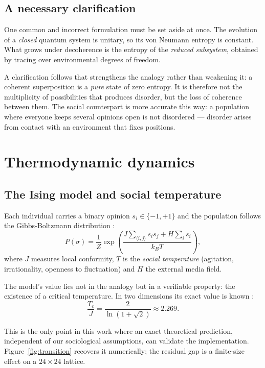 \documentclass[11pt,a4paper]{article}
\begin{document}
\subsection{A necessary clarification}

One common and incorrect formulation must be set aside at once. The evolution of a
\emph{closed} quantum system is unitary, so its von Neumann entropy is constant. What grows
under decoherence is the entropy of the \emph{reduced subsystem}, obtained by tracing over
environmental degrees of freedom.

A clarification follows that strengthens the analogy rather than weakening it: a coherent
superposition is a \emph{pure} state of zero entropy. It is therefore not the multiplicity
of possibilities that produces disorder, but the loss of coherence between them. The social
counterpart is more accurate this way: a population where everyone keeps several opinions
open is not disordered --- disorder arises from contact with an environment that fixes
positions.

\section{Thermodynamic dynamics}

\subsection{The Ising model and social temperature}

Each individual carries a binary opinion $s_i \in \{-1,+1\}$ and the population follows the
Gibbs-Boltzmann distribution \citep{ising1925}:
\begin{equation}
P(\sigma) = \frac{1}{Z}
\exp\!\left(\frac{J \sum_{\langle i,j\rangle} s_i s_j + H \sum_i s_i}{k_B T}\right),
\end{equation}
where $J$ measures local conformity, $T$ is the \emph{social temperature} (agitation,
irrationality, openness to fluctuation) and $H$ the external media field.

The model's value lies not in the analogy but in a verifiable property: the existence of a
critical temperature. In two dimensions its exact value is known \citep{onsager1944}:
\begin{equation}
\frac{T_c}{J} = \frac{2}{\ln(1+\sqrt{2})} \approx 2.269 .
\label{eq:onsager}
\end{equation}

This is the only point in this work where an exact theoretical prediction, independent of
our sociological assumptions, can validate the implementation.
Figure~\ref{fig:transition} recovers it numerically; the residual gap is a finite-size
effect on a $24\times24$ lattice.
\end{document}
